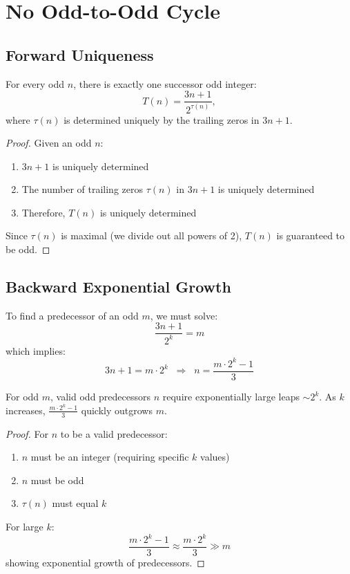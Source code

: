 \section{No Odd-to-Odd Cycle}\label{sec:no_odd_cycle}

\subsection{Forward Uniqueness}

\begin{lemma}
For every odd $n$, there is exactly one successor odd integer:
\[
T(n) = \frac{3n + 1}{2^{\tau(n)}},
\]
where $\tau(n)$ is determined uniquely by the trailing zeros in $3n+1$.
\end{lemma}

\begin{proof}
Given an odd $n$:
\begin{enumerate}
\item $3n + 1$ is uniquely determined
\item The number of trailing zeros $\tau(n)$ in $3n + 1$ is uniquely determined
\item Therefore, $T(n)$ is uniquely determined
\end{enumerate}
Since $\tau(n)$ is maximal (we divide out all powers of 2), $T(n)$ is guaranteed to be odd.
\end{proof}

\subsection{Backward Exponential Growth}

To find a predecessor of an odd $m$, we must solve:
\[
\frac{3n + 1}{2^k} = m
\]
which implies:
\[
3n + 1 = m\cdot 2^k \;\;\Rightarrow\;\; n = \frac{m\cdot 2^k - 1}{3}
\]

\begin{lemma}
For odd $m$, valid odd predecessors $n$ require exponentially large leaps $\sim 2^k$. As $k$ increases, $\frac{m\cdot 2^k - 1}{3}$ quickly outgrows $m$.
\end{lemma}

\begin{proof}
For $n$ to be a valid predecessor:
\begin{enumerate}
\item $n$ must be an integer (requiring specific $k$ values)
\item $n$ must be odd
\item $\tau(n)$ must equal $k$
\end{enumerate}

For large $k$:
\[
\frac{m\cdot 2^k - 1}{3} \approx \frac{m\cdot 2^k}{3} \gg m
\]
showing exponential growth of predecessors.
\end{proof}

